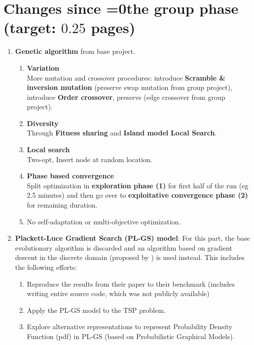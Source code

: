 \documentclass[a4paper,10pt]{article}
\def\retake{0}
\newcommand{\switch}[2]{\ifnum\retake=0{#1}\else{#2}\fi}
\newcommand{\ReplaceMe}[1]{{\color{blue}#1}}
\begin{document}
\section{Changes since \switch{the group phase}{your previous submission} (target: $0.25$ pages)}

\begin{enumerate}
	\item \textbf{Genetic algorithm} from base project.
	\begin{enumerate}
	\item \textbf{Variation} \\
			More mutation and crossover procedures: introduce \textbf{Scramble \& inversion mutation} (preserve swap mutation from group project), introduce \textbf{Order crossover}, preserve (edge crossover from group project).
				
	\item \textbf{Diversity} \\
			Through \textbf{Fitness sharing} and \textbf{Island model} \textbf{Local Search}.

	\item \textbf{Local search} \\
			Two-opt, Insert node at random location.
	
	\item \textbf{Phase based convergence} \\
		Split optimization in \textbf{exploration phase (1)} for first half of the run (eg 2.5 minutes) and then go over to \textbf{exploitative convergence phase (2)} for remaining duration.
		
	\item No self-adaptation or multi-objective optimization.
	\end{enumerate}
	
	\item \textbf{Plackett-Luce Gradient Search (PL-GS) model}: For this part, the base evolutionary algorithm is discarded and an algorithm based on gradient descent in the discrete domain (proposed by \citep{ceberiojosu_model-based_2023, santucci_gradient_2020}) is used instead. This includes the following efforts:
		\begin{enumerate}
			\item Reproduce the results from their paper to their benchmark (includes writing entire source code, which was not publicly available)
			\item Apply the PL-GS model to the TSP problem.
			\item Explore alternative representations to represent Probability Density Function (pdf) in PL-GS (based on Probabilistic Graphical Models).
		\end{enumerate}
	
\end{enumerate}
\end{document}
